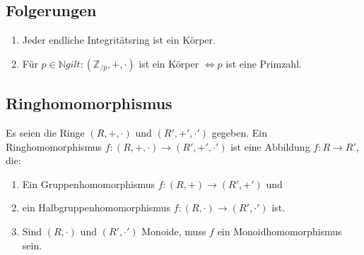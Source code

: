 \subsection{Folgerungen}
\begin{enumerate}
	\item Jeder endliche Integritätsring ist ein Körper.
	\item Für $p \in \mathbb{N} gilt: (\mathbb{Z}_{/p}, +, \cdot)$ ist ein Körper $\Leftrightarrow p$ ist eine Primzahl.
\end{enumerate}

\subsection{Ringhomomorphismus}
Es seien die Ringe $(R, +, \cdot)$ und $(R', +', \cdot')$ gegeben. Ein Ringhomomorphismus $f: (R, +, \cdot) \rightarrow (R', +', \cdot')$ ist eine Abbildung $f : R \rightarrow R'$, die:
\begin{enumerate}
	\item Ein Gruppenhomomorphismus $f: (R, +) \rightarrow (R', +')$ und
	\item ein Halbgruppenhomomorphismus $f: (R, \cdot) \rightarrow (R', \cdot')$ ist.
	\item Sind $(R, \cdot)$ und $(R', \cdot')$ Monoide, muss $f$ ein Monoidhomomorphismus sein.
\end{enumerate}

